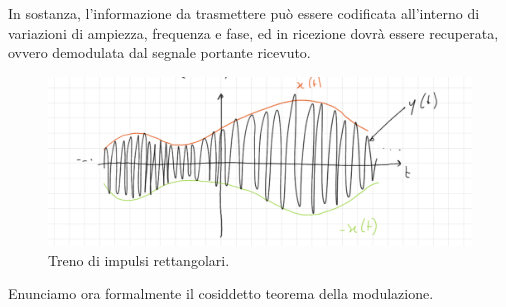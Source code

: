 \documentclass[12pt,oneside,openany]{memoir}
\numberwithin{equation}{subsection}
\begin{document}
In sostanza, l'informazione da trasmettere pu\`o essere codificata all'interno
di variazioni di ampiezza, frequenza e fase, ed in ricezione dovr\`a essere
recuperata, ovvero demodulata dal segnale portante ricevuto.
\begin{figure}[H]
	\centering
	\captionsetup{justification=centering}
	\includegraphics[width=1.0\textwidth]{images/segnale_modulato.png}
	\caption{Treno di impulsi rettangolari.}
\end{figure}
Enunciamo ora formalmente il cosiddetto teorema della modulazione.


\newpage
\end{document}
